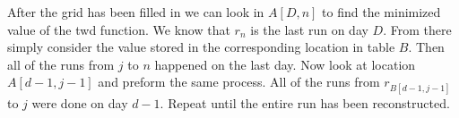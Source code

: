 \documentclass{article}
\begin{document}
After the grid has been filled in we can look in $A[D, n]$ to find the minimized value of the twd function. We know that $r_n$ is the last run on day $D$. From there simply consider the value stored in the corresponding location in table $B$. Then  all of the runs from $j$ to $n$ happened on the last day. Now look at location $A[d-1, j-1]$ and preform the same process. All of the runs from $r_{B[d-1, j-1]}$ to $j$ were done on day $d-1$. Repeat until the entire run has been reconstructed.
\end{document}
